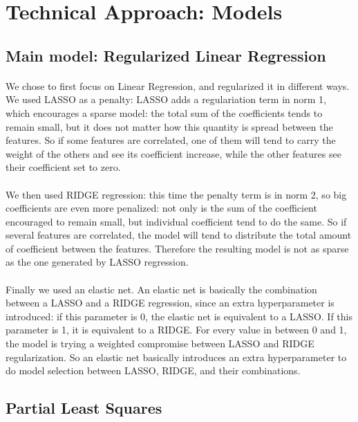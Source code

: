 \documentclass[11pt]{article}
\begin{document}
\section{Technical Approach: Models}
    \subsection{Main model: Regularized Linear Regression}
    \paragraph{}
    We chose to first focus on Linear Regression, and regularized it in different ways. We used LASSO as a penalty: LASSO adds a regulariation term in norm 1, which encourages a sparse model: the total sum of the
    coefficients tends to remain small, but it does not matter how this quantity is spread between the features.
    So if some features are correlated, one of them will tend to carry the weight of the others and see its coefficient increase, while the 
    other features see their coefficient set to zero. 
    \paragraph{}
    We then used RIDGE regression: this time the penalty term is in norm 2, so big coefficients are even more penalized: not only is the sum
    of the coefficient encouraged to remain small, but individual coefficient tend to do the same. So if several features are
    correlated, the model will tend to distribute the total amount of coefficient between the features. Therefore the resulting model is not
    as sparse as the one generated by LASSO regression. 
    \paragraph{}
    Finally we used an elastic net. An elastic net is basically the combination between a LASSO and a RIDGE regression, since an extra
    hyperparameter is introduced: if this parameter is 0, the elastic net is equivalent to a LASSO. If this parameter is 1, it is equivalent
    to a RIDGE. For every value in between 0 and 1, the model is trying a weighted compromise between LASSO and RIDGE regularization.
    So an elastic net basically introduces an extra hyperparameter to do model selection between LASSO, RIDGE, and their combinations.
    
    \subsection{Partial Least Squares}
\end{document}
